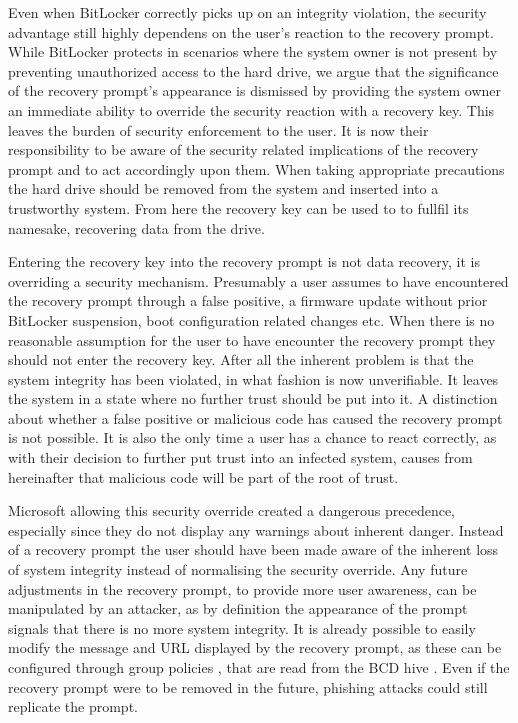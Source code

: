 Even when BitLocker correctly picks up on an integrity violation, the security advantage still highly dependens on the user's reaction to the recovery prompt.
While BitLocker protects in scenarios where the system owner is not present by preventing unauthorized access to the hard drive, we argue that the significance of the recovery prompt's appearance is dismissed by providing the system owner an immediate ability to override the security reaction with a recovery key.
This leaves the burden of security enforcement to the user.
It is now their responsibility to be aware of the security related implications of the recovery prompt and to act accordingly upon them.
When taking appropriate precautions the hard drive should be removed from the system and inserted into a trustworthy system.
From here the recovery key can be used to to fullfil its namesake, recovering data from the drive.

Entering the recovery key into the recovery prompt is not data recovery, it is overriding a security mechanism.
Presumably a user assumes to have encountered the recovery prompt through a false positive, a firmware update without prior BitLocker suspension, boot configuration related changes etc.
When there is no reasonable assumption for the user to have encounter the recovery prompt they should not enter the recovery key.
After all the inherent problem is that the system integrity has been violated, in what fashion is now unverifiable.
It leaves the system in a state where no further trust should be put into it.
A distinction about whether a false positive or malicious code has caused the recovery prompt is not possible.
It is also the only time a user has a chance to react correctly, as with their decision to further put trust into an infected system, causes from hereinafter that malicious code will be part of the root of trust.

Microsoft allowing this security override created a dangerous precedence, especially since they do not display any warnings about inherent danger.
Instead of a recovery prompt the user should have been made aware of the inherent loss of system integrity instead of normalising the security override.
Any future adjustments in the recovery prompt, to provide more user awareness, can be manipulated by an attacker, as by definition the appearance of the prompt signals that there is no more system integrity.
It is already possible to  easily modify the message and URL displayed by the recovery prompt, as these can be configured through group policies \cite{microsoft-windows-bitlocker-group-policy-settings}, that are read from the \ac{BCD} hive \cite{microsoft-windows-bcd-settings-and-bitlocker}.
Even if the recovery prompt were to be removed in the future, phishing attacks could still replicate the prompt.


